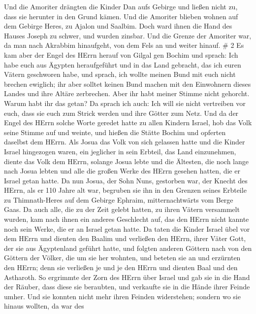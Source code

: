  Und die Amoriter drängten die Kinder Dan aufs Gebirge und
ließen nicht zu, dass sie herunter in den Grund kämen.  Und
die Amoriter blieben wohnen auf dem Gebirge Heres, zu Ajalon und
Saalbim. Doch ward ihnen die Hand des Hauses Joseph zu schwer, und
wurden zinsbar.  Und die Grenze der Amoriter war, da man
nach Akrabbim hinaufgeht, von dem Fels an und weiter hinauf. \# 2
 Es kam aber der Engel des HErrn herauf von Gilgal gen
Bochim und sprach: Ich habe euch aus Ägypten heraufgeführt und in das
Land gebracht, das ich euren Vätern geschworen habe, und sprach, ich
wollte meinen Bund mit euch nicht brechen ewiglich;  ihr
aber solltet keinen Bund machen mit den Einwohnern dieses Landes und
ihre Altäre zerbrechen. Aber ihr habt meiner Stimme nicht gehorcht.
Warum habt ihr das getan?  Da sprach ich auch: Ich will sie
nicht vertreiben vor euch, dass sie euch zum Strick werden und ihre
Götter zum Netz.  Und da der Engel des HErrn solche Worte
geredet hatte zu allen Kindern Israel, hob das Volk seine Stimme auf und
weinte,  und hießen die Stätte Bochim und opferten daselbst
dem HErrn.  Als Josua das Volk von sich gelassen hatte und
die Kinder Israel hingezogen waren, ein jeglicher in sein Erbteil, das
Land einzunehmen,  diente das Volk dem HErrn, solange Josua
lebte und die Ältesten, die noch lange nach Josua lebten und alle die
großen Werke des HErrn gesehen hatten, die er Israel getan hatte.
 Da nun Josua, der Sohn Nuns, gestorben war, der Knecht des
HErrn, als er 110 Jahre alt war,  begruben sie ihn in den
Grenzen seines Erbteile zu Thimnath-Heres auf dem Gebirge Ephraim,
mitternachtwärts vom Berge Gaas.  Da auch alle, die zu der
Zeit gelebt hatten, zu ihren Vätern versammelt wurden, kam nach ihnen
ein anderes Geschlecht auf, das den HErrn nicht kannte noch sein Werke,
die er an Israel getan hatte.  Da taten die Kinder Israel
übel vor dem HErrn und dienten den Baalim  und verließen
den HErrn, ihrer Väter Gott, der sie aus Ägyptenland geführt hatte, und
folgten anderen Göttern nach von den Göttern der Völker, die um sie her
wohnten, und beteten sie an und erzürnten den HErrn;  denn
sie verließen je und je den HErrn und dienten Baal und den Astharoth.
 So ergrimmte der Zorn des HErrn über Israel und gab sie in
die Hand der Räuber, dass diese sie beraubten, und verkaufte sie in die
Hände ihrer Feinde umher. Und sie konnten nicht mehr ihren Feinden
widerstehen;  sondern wo sie hinaus wollten, da war des
